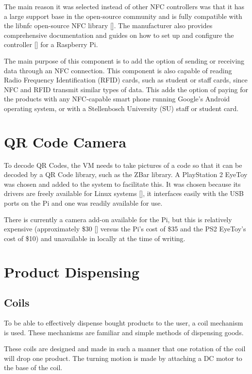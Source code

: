 The main reason it
was selected instead of other NFC controllers was that it has a large support base in the
open-source community and is fully compatible with the libnfc open-source NFC library
[\cite{website:libnfc-hardware}]. The manufacturer also provides
comprehensive documentation and guides on how to set up and configure the controller
[\cite{website:adafruit-tutorial}] for a Raspberry Pi.
 
The main purpose of this component is to add the option of sending or receiving data
through an NFC connection. This component is also capable of reading Radio
Frequency Identification (RFID) cards, such as student or staff cards, since NFC and RFID
transmit similar types of data. This adds the option of paying for the products with any
NFC-capable smart phone running Google's Android operating system, or with a Stellenbosch
University (SU) staff or student card.

\section{QR Code Camera}
\label{sec:webcam}

To decode QR Codes, the VM needs to take pictures of a code so that it can be
decoded by a QR Code library, such as the ZBar library. A PlayStation 2 EyeToy was
chosen and added to the system to facilitate this. It was chosen because its drivers are
freely available for Linux systems [\cite{website:webcam-drivers}], it interfaces easily
with the USB ports on the Pi and one was readily available for use.

There is currently a camera add-on available for the Pi, but this is relatively
expensive (approximately \$30 [\cite{website:raspi-camera}] versus the Pi's cost of \$35 
and the PS2 EyeToy's cost of \$10) and unavailable in locally at the time of writing.

\section{Product Dispensing}

\subsection{Coils}

To be able to effectively dispense bought products to the user, a coil mechanism is
used. These mechanisms are familiar and simple methods of dispensing goods.

These coils are designed and made in such a manner that one rotation of the coil will drop one
product. The turning motion is made by attaching a DC motor to the base of the coil.

